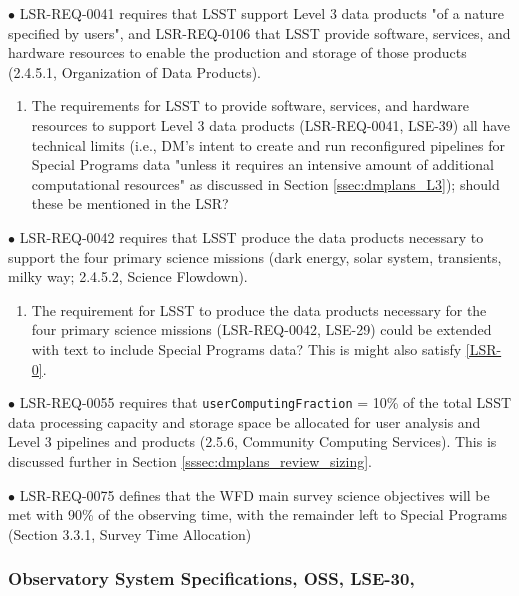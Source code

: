 \documentclass[DM,lsstdraft,toc]{lsstdoc}
\begin{document}
$\bullet$ LSR-REQ-0041 requires that LSST support Level 3 data products "of a nature specified by users", and LSR-REQ-0106 that LSST provide software, services, and hardware resources to enable the production and storage of those products (2.4.5.1, Organization of Data Products).
\begin{enumerate}[topsep=-10pt,after=\vspace{10pt},label= \textbf{Concern \Roman*.},resume] \item \label{LSR-4} The requirements for LSST to provide software, services, and hardware resources to support Level 3 data products (LSR-REQ-0041, LSE-39) all have technical limits (i.e., DM's intent to create and run reconfigured pipelines for Special Programs data "unless it requires an intensive amount of additional computational resources" as discussed in Section \ref{ssec:dmplans_L3}); should these be mentioned in the LSR? \end{enumerate}

$\bullet$ LSR-REQ-0042 requires that LSST produce the data products necessary to support the four primary science missions (dark energy, solar system, transients, milky way; 2.4.5.2, Science Flowdown). 
\begin{enumerate}[topsep=-10pt,after=\vspace{10pt},label= \textbf{Concern \Roman*.},resume] \item \label{LSR-5} The requirement for LSST to produce the data products necessary for the four primary science missions (LSR-REQ-0042, LSE-29) could be extended with text to include Special Programs data? This is might also satisfy \ref{LSR-0}. \end{enumerate}

$\bullet$ LSR-REQ-0055 requires that {\tt userComputingFraction} = 10\% of the total LSST data processing capacity and storage space be allocated for user analysis and Level 3 pipelines and products (2.5.6, Community Computing Services). This is discussed further in Section \ref{sssec:dmplans_review_sizing}.

$\bullet$ LSR-REQ-0075 defines that the WFD main survey science objectives will be met with 90\% of the observing time, with the remainder left to Special Programs (Section 3.3.1, Survey Time Allocation) 


\subsubsection{Observatory System Specifications, OSS, LSE-30, \cite{LSE-30}}\label{sssec:dmplans_review_oss}
\end{document}
